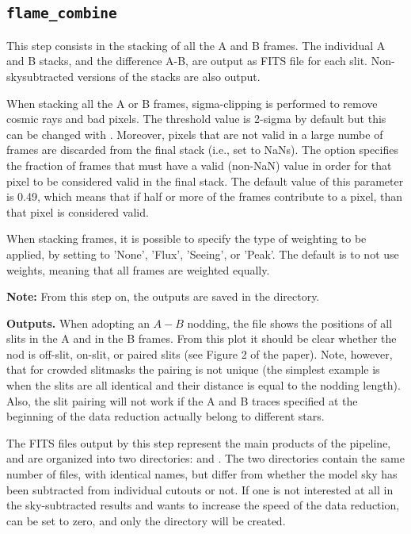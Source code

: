 \documentclass[a4paper]{article}
\begin{document}
\begin{sloppypar}
\subsection{\texttt{flame\_combine}}
\label{sec:combine}

This step consists in the stacking of all the A and B frames. The individual A and B stacks, and the difference A-B, are output as FITS file for each slit. Non-skysubtracted versions of the stacks are also output.

When stacking all the A or B frames, sigma-clipping is performed to remove cosmic rays and bad pixels. The threshold value is 2-sigma by default but this can be changed with . Moreover, pixels that are not valid in a large numbe of frames are discarded from the final stack (i.e., set to NaNs). The  option specifies the fraction of frames that must have a valid (non-NaN) value in order for that pixel to be considered valid in the final stack. The default value of this parameter is 0.49, which means that if half or more of the frames contribute to a pixel, than that pixel is considered valid.

When stacking frames, it is possible to specify the type of weighting to be applied, by setting  to 'None', 'Flux', 'Seeing', or 'Peak'. The default is to not use weights, meaning that all frames are weighted equally.

\medskip
\noindent
\textbf{Note:} From this step on, the outputs are saved in the  directory.

\medskip
\noindent
\textbf{Outputs.} When adopting an $A-B$ nodding, the file  shows the positions of all slits in the A and in the B frames. From this plot it should be clear whether the nod is off-slit, on-slit, or paired slits (see Figure 2 of the paper). Note, however, that for crowded slitmasks the pairing is not unique (the simplest example is when the slits are all identical and their distance is equal to the nodding length). Also, the slit pairing will not work if the A and B traces specified at the beginning of the data reduction actually belong to different stars.

The FITS files output by this step represent the main products of the pipeline, and are organized into two directories:  and . The two directories contain the same number of files, with identical names, but differ from whether the model sky has been subtracted from individual cutouts or not. If one is not interested at all in the sky-subtracted results and wants to increase the speed of the data reduction,  can be set to zero, and only the  directory will be created.


\end{sloppypar}
\end{document}
